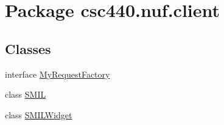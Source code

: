 \hypertarget{namespacecsc440_1_1nuf_1_1client}{\section{Package csc440.\-nuf.\-client}
\label{namespacecsc440_1_1nuf_1_1client}
}
\subsection*{Classes}
\begin{DoxyCompactItemize}
\item 
interface \hyperlink{interfacecsc440_1_1nuf_1_1client_1_1_my_request_factory}{My\-Request\-Factory}
\item 
class \hyperlink{classcsc440_1_1nuf_1_1client_1_1_s_m_i_l}{S\-M\-I\-L}
\item 
class \hyperlink{classcsc440_1_1nuf_1_1client_1_1_s_m_i_l_widget}{S\-M\-I\-L\-Widget}
\end{DoxyCompactItemize}
